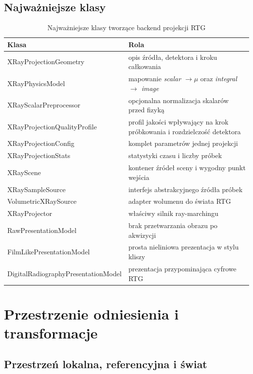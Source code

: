 \documentclass[12pt,a4paper]{article}
\begin{document}
\subsection{Najważniejsze klasy}

\begin{table}[H]
\centering
\caption{Najważniejsze klasy tworzące backend projekcji RTG}
\begin{tabular}{>{\ttfamily}p{4.5cm} p{9.8cm}}
\toprule
\textbf{Klasa} & \textbf{Rola} \\
\midrule
XRayProjectionGeometry & opis źródła, detektora i kroku całkowania \\
XRayPhysicsModel & mapowanie \textit{scalar \(\rightarrow \mu\)} oraz \textit{integral \(\rightarrow\) image} \\
XRayScalarPreprocessor & opcjonalna normalizacja skalarów przed fizyką \\
XRayProjectionQualityProfile & profil jakości wpływający na krok próbkowania i rozdzielczość detektora \\
XRayProjectionConfig & komplet parametrów jednej projekcji \\
XRayProjectionStats & statystyki czasu i liczby próbek \\
XRayScene & kontener źródeł sceny i wygodny punkt wejścia \\
XRaySampleSource & interfejs abstrakcyjnego źródła próbek \\
VolumetricXRaySource & adapter wolumenu do świata RTG \\
XRayProjector & właściwy silnik ray-marchingu \\
RawPresentationModel & brak przetwarzania obrazu po akwizycji \\
FilmLikePresentationModel & prosta nieliniowa prezentacja w stylu kliszy \\
DigitalRadiographyPresentationModel & prezentacja przypominająca cyfrowe RTG \\
\bottomrule
\end{tabular}
\end{table}

\section{Przestrzenie odniesienia i transformacje}

\subsection{Przestrzeń lokalna, referencyjna i świat}
\end{document}
